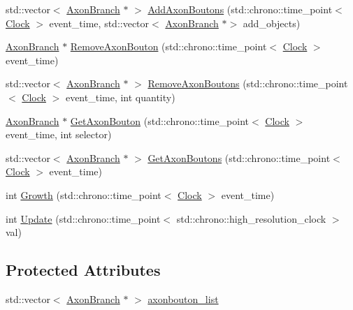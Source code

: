 \begin{DoxyCompactItemize}
\item 
std\+::vector$<$ \hyperlink{class_axon_branch}{Axon\+Branch} $\ast$ $>$ \hyperlink{class_axon_branch_a788ca8cc7e6f60f07b9e19a8e3022b64}{Add\+Axon\+Boutons} (std\+::chrono\+::time\+\_\+point$<$ \hyperlink{universe_8h_a0ef8d951d1ca5ab3cfaf7ab4c7a6fd80}{Clock} $>$ event\+\_\+time, std\+::vector$<$ \hyperlink{class_axon_branch}{Axon\+Branch} $\ast$$>$ add\+\_\+objects)
\item 
\hyperlink{class_axon_branch}{Axon\+Branch} $\ast$ \hyperlink{class_axon_branch_a06753a2a61941a59d86510e51ba44b15}{Remove\+Axon\+Bouton} (std\+::chrono\+::time\+\_\+point$<$ \hyperlink{universe_8h_a0ef8d951d1ca5ab3cfaf7ab4c7a6fd80}{Clock} $>$ event\+\_\+time)
\item 
std\+::vector$<$ \hyperlink{class_axon_branch}{Axon\+Branch} $\ast$ $>$ \hyperlink{class_axon_branch_a815e055e37f89fb2627b250c5b95d406}{Remove\+Axon\+Boutons} (std\+::chrono\+::time\+\_\+point$<$ \hyperlink{universe_8h_a0ef8d951d1ca5ab3cfaf7ab4c7a6fd80}{Clock} $>$ event\+\_\+time, int quantity)
\item 
\hyperlink{class_axon_branch}{Axon\+Branch} $\ast$ \hyperlink{class_axon_branch_a6fa6eea91e72fd142f3d691f7ca4c99a}{Get\+Axon\+Bouton} (std\+::chrono\+::time\+\_\+point$<$ \hyperlink{universe_8h_a0ef8d951d1ca5ab3cfaf7ab4c7a6fd80}{Clock} $>$ event\+\_\+time, int selector)
\item 
std\+::vector$<$ \hyperlink{class_axon_branch}{Axon\+Branch} $\ast$ $>$ \hyperlink{class_axon_branch_aafadba57924686a8087c7f7758889045}{Get\+Axon\+Boutons} (std\+::chrono\+::time\+\_\+point$<$ \hyperlink{universe_8h_a0ef8d951d1ca5ab3cfaf7ab4c7a6fd80}{Clock} $>$ event\+\_\+time)
\item 
int \hyperlink{class_axon_branch_a6e434a57873ab0fdbc72cf7ecc7228ed}{Growth} (std\+::chrono\+::time\+\_\+point$<$ \hyperlink{universe_8h_a0ef8d951d1ca5ab3cfaf7ab4c7a6fd80}{Clock} $>$ event\+\_\+time)
\item 
int \hyperlink{class_axon_branch_a5a80bcccdc2be9f77fca25131937b52f}{Update} (std\+::chrono\+::time\+\_\+point$<$ std\+::chrono\+::high\+\_\+resolution\+\_\+clock $>$ val)
\end{DoxyCompactItemize}
\subsection*{Protected Attributes}
\begin{DoxyCompactItemize}
\item 
std\+::vector$<$ \hyperlink{class_axon_branch}{Axon\+Branch} $\ast$ $>$ \hyperlink{class_axon_branch_a43224f9fcb62274709438c9833cb10e5}{axonbouton\+\_\+list}
\end{DoxyCompactItemize}
